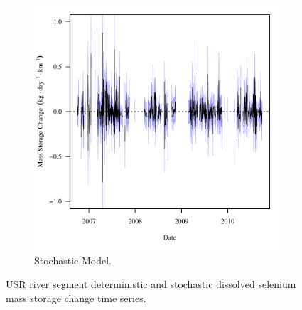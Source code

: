 \begin{linenumbers}
\begin{landscape}
\begin{figure}
\begin{subfigure}{0.7\textwidth}
			\includegraphics[width=\tableCustomSize]{"Figures/Results_USR/Stochastic/f Segment B"}
			\caption{Stochastic Model.}
		\end{subfigure}
		\caption{USR river segment deterministic and stochastic dissolved selenium mass storage change time series.}
	\end{figure}
\end{landscape}


\end{linenumbers}
